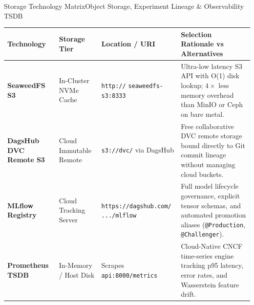 \begin{frame}{Storage Technology Matrix}{Object Storage, Experiment Lineage \& Observability TSDB}
    \vspace{-0.2cm}
    \begin{center}\scriptsize\renewcommand{\arraystretch}{0.80}
        \begin{tabular}{>{\raggedright\arraybackslash}p{2.3cm} >{\raggedright\arraybackslash}p{2.0cm} >{\raggedright\arraybackslash}p{3.1cm} >{\raggedright\arraybackslash}p{4.2cm}}
            \toprule
            \textbf{Technology} & \textbf{Storage Tier} & \textbf{Location / URI} & \textbf{Selection Rationale vs Alternatives} \\
            \midrule
            \textbf{SeaweedFS S3} & In-Cluster NVMe Cache & \texttt{http://} \newline \texttt{seaweedfs-s3:8333} & Ultra-low latency S3 API with O(1) disk lookup; $4\times$ less memory overhead than MinIO or Ceph on bare metal. \\
            \midrule
            \textbf{DagsHub DVC Remote S3} & Cloud Immutable Remote & \texttt{s3://dvc/} \newline \textsf{via DagsHub} & Free collaborative DVC remote storage bound directly to Git commit lineage without managing cloud buckets. \\
            \midrule
            \textbf{MLflow Registry} & Cloud Tracking Server & \texttt{https://dagshub.com/} \newline \texttt{.../mlflow} & Full model lifecycle governance, explicit tensor schemas, and automated promotion aliases (\texttt{@Production}, \texttt{@Challenger}). \\
            \midrule
            \textbf{Prometheus TSDB} & In-Memory / Host Disk & Scrapes \texttt{api:8000/metrics} & Cloud-Native CNCF time-series engine tracking p95 latency, error rates, and Wasserstein feature drift. \\
            \bottomrule
        \end{tabular}
    \end{center}

\end{frame}

